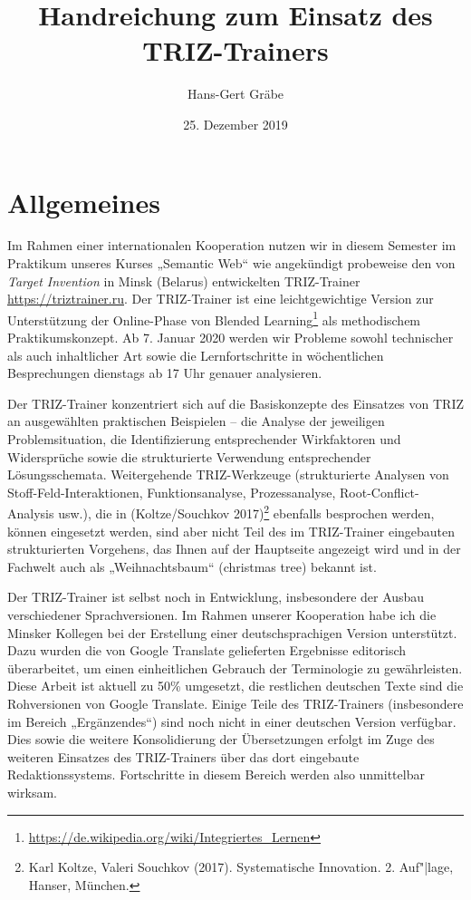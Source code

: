 \documentclass[11pt,a4paper]{article}
\title{Handreichung zum Einsatz des TRIZ-Trainers}
\author{Hans-Gert Gr\"abe}
\date{25. Dezember 2019}
\begin{document}
\maketitle

\section{Allgemeines}

Im Rahmen einer internationalen Kooperation nutzen wir in diesem Semester im
Praktikum unseres Kurses „Semantic Web“ wie angekündigt probeweise den von
\emph{Target Invention} in Minsk (Belarus) entwickelten TRIZ-Trainer
\url{https://triztrainer.ru}.  Der TRIZ-Trainer ist eine leichtgewichtige
Version zur Unterstützung der Online-Phase von Blended
Learning\footnote{\url{https://de.wikipedia.org/wiki/Integriertes_Lernen}} als
methodischem Praktikumskonzept.  Ab 7. Januar 2020 werden wir Probleme sowohl
technischer als auch inhaltlicher Art sowie die Lernfortschritte in
wöchentlichen Besprechungen dienstags ab 17 Uhr genauer analysieren.

Der TRIZ-Trainer konzentriert sich auf die Basiskonzepte des Einsatzes von
TRIZ an ausgewählten praktischen Beispielen -- die Analyse der jeweiligen
Problemsituation, die Identifizierung entsprechender Wirkfaktoren und
Widersprüche sowie die strukturierte Verwendung entsprechender
Lösungsschemata.  Weitergehende TRIZ-Werkzeuge (strukturierte Analysen von
Stoff-Feld-Interaktionen, Funktionsanalyse, Prozessanalyse,
Root-Conflict-Analysis usw.), die in (Koltze/Souchkov 2017)\footnote{Karl
  Koltze, Valeri Souchkov (2017). Systematische Innovation.  2. Auf"|lage,
  Hanser, München.} ebenfalls besprochen werden, können eingesetzt werden,
sind aber nicht Teil des im TRIZ-Trainer eingebauten strukturierten Vorgehens,
das Ihnen auf der Hauptseite angezeigt wird und in der Fachwelt auch als
„Weihnachtsbaum“ (christmas tree) bekannt ist.

Der TRIZ-Trainer ist selbst noch in Entwicklung, insbesondere der Ausbau
verschiedener Sprachversionen.  Im Rahmen unserer Kooperation habe ich die
Minsker Kollegen bei der Erstellung einer deutschsprachigen Version
unterstützt.  Dazu wurden die von Google Translate gelieferten Ergebnisse
editorisch überarbeitet, um einen einheitlichen Gebrauch der Terminologie zu
gewährleisten. Diese Arbeit ist aktuell zu 50\% umgesetzt, die restlichen
deutschen Texte sind die Rohversionen von Google Translate.  Einige Teile des
TRIZ-Trainers (insbesondere im Bereich „Ergänzendes“) sind noch nicht in einer
deutschen Version verfügbar. Dies sowie die weitere Konsolidierung der
Übersetzungen erfolgt im Zuge des weiteren Einsatzes des TRIZ-Trainers über
das dort eingebaute Redaktionssystems. Fortschritte in diesem Bereich werden
also unmittelbar wirksam.
\end{document}
